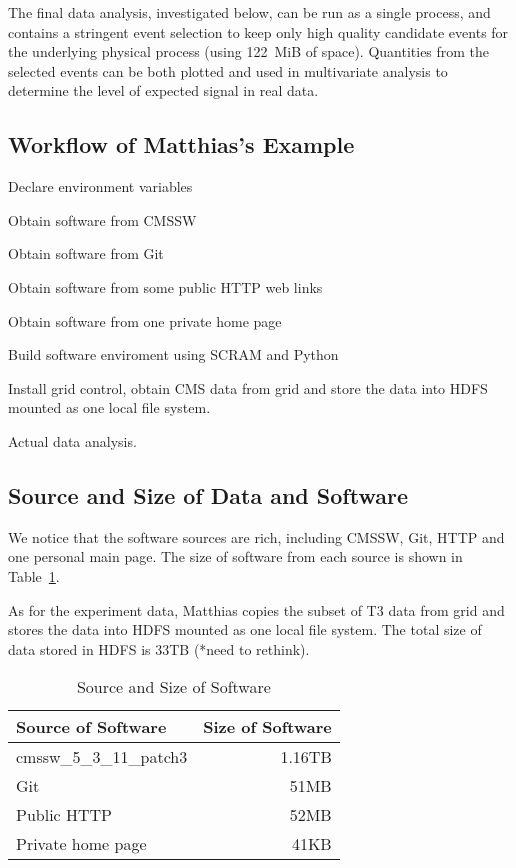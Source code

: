 \documentclass{acm_proc_article-sp}
\begin{document}
The final data analysis, investigated below, can be run as a single
process, and contains a stringent event selection to keep only high
quality candidate events for the underlying physical process (using
\SI{122}{MiB} of space).  Quantities from the selected events can be
both plotted and used in multivariate analysis to determine the level
of expected signal in real data.


\subsection{Workflow of Matthias's Example}
Declare environment variables

Obtain software from CMSSW

Obtain software from Git

Obtain software from some public HTTP web links

Obtain software from one private home page

Build software enviroment using SCRAM and Python

Install grid control, obtain CMS data from grid and store the data into HDFS mounted as one local file system.

Actual data analysis.

\subsection{Source and Size of Data and Software}
We notice that the software sources are rich, including CMSSW, Git, HTTP and one personal main page. The size of software from each source is shown in Table~\ref{table:software-source-size}.

As for the experiment data, Matthias copies the subset of T3 data from grid and stores the data into HDFS mounted as one local file system. The total size of data stored in HDFS is 33TB (*need to rethink).

\begin{table}
    \centering
    \begin{tabular}{|l|r|}
        \hline
        Source of Software & Size of Software \\ \hline
        cmssw\_5\_3\_11\_patch3 & 1.16TB \\ \hline
        Git & 51MB \\ \hline
        Public HTTP & 52MB \\ \hline
        Private home page & 41KB \\ \hline
    \end{tabular}
    \caption{Source and Size of Software}
    \label{table:software-source-size}
\end{table}
\end{document}
